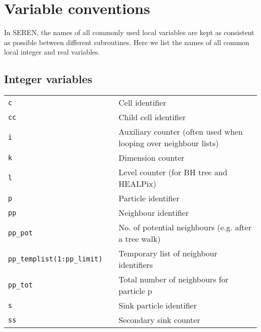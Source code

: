 \documentclass[a4paper]{article}
\newcommand{\var}[1]{\texttt{#1}}
\begin{document}
\section{Variable conventions}
In SEREN, the names of all commonly used local variables are kept as 
consistent as possible between different subroutines.  
Here we list the names of all common local integer and real variables.  

\subsection{Integer variables}
\begin{tabular}{lll}
\var{c}  &  &  Cell identifier \\
\var{cc} &  &  Child cell identifier \\
\var{i}  &  &  Auxiliary counter (often used when looping over neighbour lists) \\
\var{k}  &  &  Dimension counter \\
\var{l}  &  &  Level counter (for BH tree and HEALPix) \\
\var{p}  &  &  Particle identifier  \\
\var{pp} &  &  Neighbour identifier \\
\var{pp\_pot} & & No. of potential neighbours (e.g. after a tree walk) \\
\var{pp\_templist(1:pp\_limit)} &  & Temporary list of neighbour identifiers \\
\var{pp\_tot} & & Total number of neighbours for particle p \\
\var{s}  &  &  Sink particle identifier \\
\var{ss} &  &  Secondary sink counter
\end{tabular}
\end{document}

